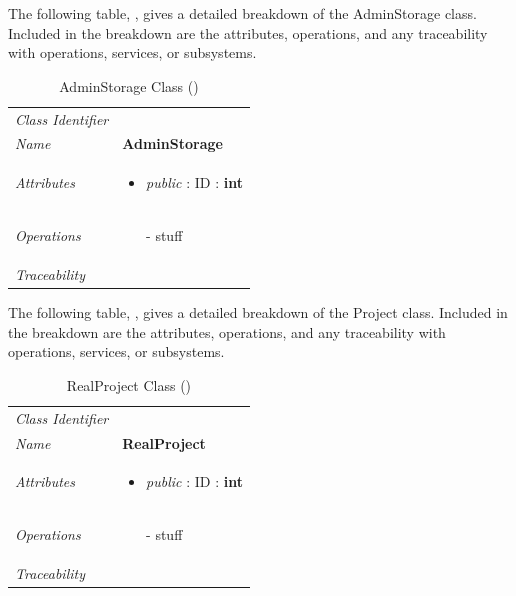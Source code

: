\documentclass[12pt,letterpaper]{article}
\begin{document}
The following table, , gives a detailed breakdown of the AdminStorage class. Included in the breakdown are the attributes, operations, and any traceability with operations, services, or subsystems.

\begin{table}[H]
    \caption{AdminStorage Class ()} 
	\begin{tabu} to 
		\toprule
		Class Identifier &  \\
		Name & {\bf AdminStorage} \\
		Attributes & 
		\begin{minipage}[t]{\linewidth}
		    \begin{itemize}
		        \item \textit{public} : ID : \bf{int}
			\end{itemize}
	    \end{minipage} \\

		Operations &
		\begin{minipage}[t]{\linewidth}
			\begin{enumerate}
			    \item[-] stuff
	        \end{enumerate}
	    \end{minipage} \\
	    	Traceability & \\
		\toprule
	\end{tabu}
\end{table}

The following table, , gives a detailed breakdown of the Project class. Included in the breakdown are the attributes, operations, and any traceability with operations, services, or subsystems.

\begin{table}[H]
    \caption{RealProject Class ()} 
	\begin{tabu} to 
		\toprule
		Class Identifier &  \\
		Name & {\bf RealProject} \\
		Attributes & 
		\begin{minipage}[t]{\linewidth}
		    \begin{itemize}
		        \item \textit{public} : ID : \bf{int}
			\end{itemize}
	    \end{minipage} \\

		Operations &
		\begin{minipage}[t]{\linewidth}
			\begin{enumerate}
			    \item[-] stuff
	        \end{enumerate}
	    \end{minipage} \\
	    	Traceability & \\
		\toprule
	\end{tabu}
\end{table}
\end{document}
